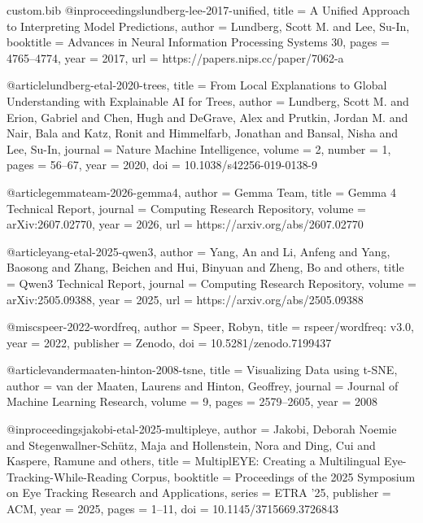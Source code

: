 \begin{filecontents*}[overwrite]{custom.bib}
@inproceedings{lundberg-lee-2017-unified,
    title     = {A Unified Approach to Interpreting Model Predictions},
    author    = {Lundberg, Scott M. and Lee, Su-In},
    booktitle = {Advances in Neural Information Processing Systems 30},
    pages     = {4765--4774},
    year      = {2017},
    url       = {https://papers.nips.cc/paper/7062-a}
}

@article{lundberg-etal-2020-trees,
    title   = {From Local Explanations to Global Understanding with Explainable {AI} for Trees},
    author  = {Lundberg, Scott M. and Erion, Gabriel and Chen, Hugh and DeGrave, Alex and
               Prutkin, Jordan M. and Nair, Bala and Katz, Ronit and Himmelfarb, Jonathan and
               Bansal, Nisha and Lee, Su-In},
    journal = {Nature Machine Intelligence},
    volume  = {2},
    number  = {1},
    pages   = {56--67},
    year    = {2020},
    doi     = {10.1038/s42256-019-0138-9}
}

@article{gemmateam-2026-gemma4,
    author  = {{Gemma Team}},
    title   = {Gemma 4 Technical Report},
    journal = {Computing Research Repository},
    volume  = {arXiv:2607.02770},
    year    = {2026},
    url     = {https://arxiv.org/abs/2607.02770}
}

@article{yang-etal-2025-qwen3,
    author  = {Yang, An and Li, Anfeng and Yang, Baosong and Zhang, Beichen and Hui, Binyuan and Zheng, Bo and others},
    title   = {{Qwen3} Technical Report},
    journal = {Computing Research Repository},
    volume  = {arXiv:2505.09388},
    year    = {2025},
    url     = {https://arxiv.org/abs/2505.09388}
}

@misc{speer-2022-wordfreq,
    author    = {Speer, Robyn},
    title     = {rspeer/wordfreq: v3.0},
    year      = {2022},
    publisher = {Zenodo},
    doi       = {10.5281/zenodo.7199437}
}

@article{vandermaaten-hinton-2008-tsne,
    title   = {Visualizing Data using t-{SNE}},
    author  = {van der Maaten, Laurens and Hinton, Geoffrey},
    journal = {Journal of Machine Learning Research},
    volume  = {9},
    pages   = {2579--2605},
    year    = {2008}
}

@inproceedings{jakobi-etal-2025-multipleye,
    author    = {Jakobi, Deborah Noemie and Stegenwallner-Sch{\"u}tz, Maja and Hollenstein, Nora and Ding, Cui and Kaspere, Ramune and others},
    title     = {{MultiplEYE}: Creating a Multilingual Eye-Tracking-While-Reading Corpus},
    booktitle = {Proceedings of the 2025 Symposium on Eye Tracking Research and Applications},
    series    = {ETRA '25},
    publisher = {ACM},
    year      = {2025},
    pages     = {1--11},
    doi       = {10.1145/3715669.3726843}
}
\end{filecontents*}

